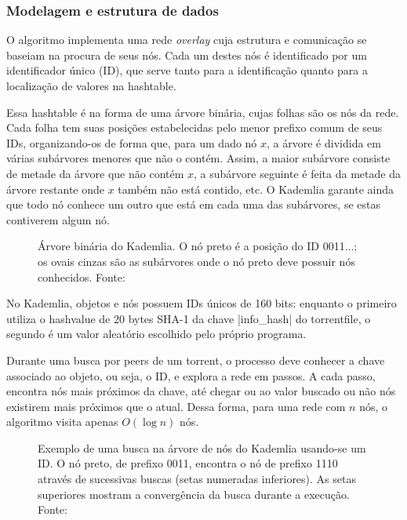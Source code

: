 
\subsubsection*{Modelagem e estrutura de dados}

O algoritmo implementa uma rede \emph{overlay} cuja estrutura e comunicação se baseiam
na procura de seus nós. Cada um destes nós é identificado por um identificador único
(ID), que serve tanto para a identificação quanto para a localização de valores na
\gls*{hashtable}.

Essa \gls*{hashtable} é na forma de uma árvore binária, cujas folhas são os nós da rede.
Cada folha tem suas posições estabelecidas pelo menor prefixo comum de seus IDs,
organizando-os de forma que, para um dado nó $x$, a árvore é dividida em várias
subárvores menores que não o contém. Assim, a maior subárvore consiste de metade da
árvore que não contém $x$, a subárvore seguinte é feita da metade da árvore restante
onde $x$ também não está contido, etc. O Kademlia garante ainda que todo nó conhece um
outro que está em cada uma das subárvores, se estas contiverem algum nó.

\begin{figure}[ht!]
    \centering
    \caption{Árvore binária do Kademlia. O nó preto é a posição do ID 0011...; os ovais
    cinzas são as subárvores onde o nó preto deve possuir nós conhecidos. Fonte:
    \cite{artigo:kademlia}}
    \label{fig:dht-arvore}
\end{figure}

No Kademlia, objetos e nós possuem IDs únicos de 160 bits: enquanto o primeiro utiliza
o \gls*{hashvalue} de 20 bytes SHA-1 da chave \bverb|info_hash| do \gls*{torrentfile},
o segundo é um valor aleatório escolhido pelo próprio programa.

Durante uma busca por \glspl*{peer} de um \gls*{torrent}, o processo deve conhecer a
chave associado ao objeto, ou seja, o ID, e explora a rede em passos. A cada passo,
encontra nós mais próximos da chave, até chegar ou ao valor buscado ou não nós
existirem mais próximos que o atual. Dessa forma, para uma rede com $n$ nós, o
algoritmo visita apenas $O(\log n)$ nós.

\newpage
\begin{figure}[ht!]
    \centering
    \caption{Exemplo de uma busca na árvore de nós do Kademlia usando-se um ID. O nó
    preto, de prefixo 0011, encontra o nó de prefixo 1110 através de sucessivas buscas
    (setas numeradas inferiores). As setas superiores mostram a convergência da
    busca durante a execução. Fonte: \cite{artigo:kademlia}}
    \label{fig:dht-arvore-busca}
\end{figure}

